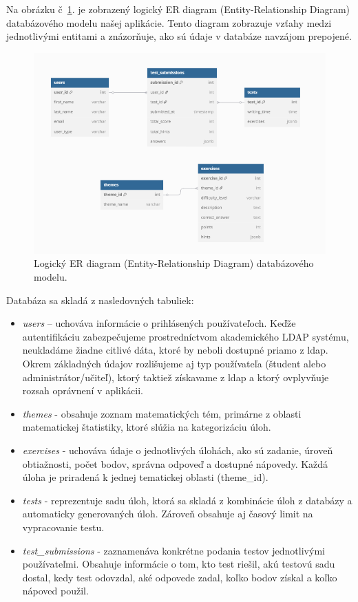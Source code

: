 Na obrázku č~\ref{dbtableobr}. je zobrazený logický ER diagram (Entity-Relationship Diagram) databázového modelu našej aplikácie.
 Tento diagram zobrazuje vzťahy medzi jednotlivými entitami a znázorňuje, ako sú údaje v databáze navzájom prepojené.
\begin{figure}[htbp]
  \centering
  \includegraphics[width=12cm]{img/dbtablefinal.png}
  \caption{Logický ER diagram (Entity-Relationship Diagram) databázového modelu.}
  \label{dbtableobr}
\end{figure} 


Databáza sa skladá z nasledovných tabuliek:
\begin{itemize}
  \item \textit{users} – uchováva informácie o prihlásených používateľoch. 
  Keďže autentifikáciu zabezpečujeme prostredníctvom akademického LDAP systému, neukladáme žiadne citlivé dáta, ktoré by neboli dostupné priamo z \acrshort{ldap}. 
  Okrem základných údajov rozlišujeme aj typ používateľa (študent alebo administrátor/učiteľ), ktorý taktiež získavame z \acrshort{ldap} a ktorý ovplyvňuje rozsah oprávnení v aplikácii.
  \item \textit{themes} - obsahuje zoznam matematických tém, primárne z oblasti matematickej štatistiky, ktoré slúžia na kategorizáciu úloh.
  \item \textit{exercises} - uchováva údaje o jednotlivých úlohách, ako sú zadanie, úroveň obtiažnosti, počet bodov, správna odpoveď a dostupné nápovedy. 
  Každá úloha je priradená k jednej tematickej oblasti (theme\_id).
  \item \textit{tests} - reprezentuje sadu úloh, ktorá sa skladá z kombinácie úloh z databázy a automaticky generovaných úloh. Zároveň obsahuje aj časový limit na vypracovanie testu.
  \item \textit{test\_submissions} -  zaznamenáva konkrétne podania testov jednotlivými používateľmi.
   Obsahuje informácie o tom, kto test riešil, akú testovú sadu dostal, kedy test odovzdal, aké odpovede zadal, koľko bodov získal a koľko nápoved použil.
\end{itemize}

